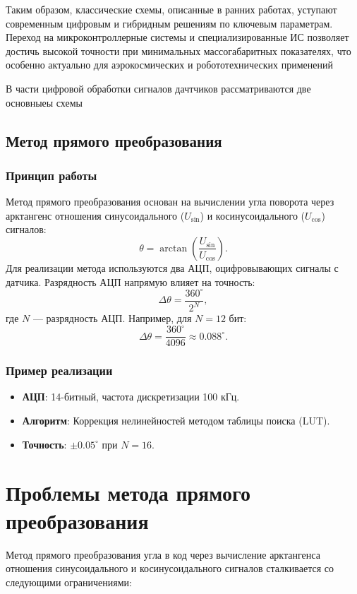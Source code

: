 Таким образом, классические схемы, описанные в ранних работах, уступают современным цифровым и гибридным решениям по ключевым параметрам. 
Переход на микроконтроллерные системы и специализированные ИС позволяет достичь высокой точности при минимальных массогабаритных показателях, 
что особенно актуально для аэрокосмических и робототехнических применений

В части цифровой обработки сигналов дачтчиков рассматриваются две основныеы схемы

\subsection{Метод прямого преобразования}
\subsubsection{Принцип работы}
Метод прямого преобразования \cite{Armenski} основан на вычислении угла поворота через арктангенс отношения синусоидального (\(U_{\sin}\)) и косинусоидального (\(U_{\cos}\)) сигналов:
\[
\theta = \arctan\left(\frac{U_{\sin}}{U_{\cos}}\right).
\]
Для реализации метода используются два АЦП, оцифровывающих сигналы с датчика. Разрядность АЦП напрямую влияет на точность: 
\[
\Delta\theta = \frac{360^\circ}{2^N},
\]
где \(N\) — разрядность АЦП. Например, для \(N = 12\) бит:
\[
\Delta\theta = \frac{360^\circ}{4096} \approx 0.088^\circ.
\]

\subsubsection*{Пример реализации}
\begin{itemize}
    \item \textbf{АЦП}: 14-битный, частота дискретизации 100 кГц.
    \item \textbf{Алгоритм}: Коррекция нелинейностей методом таблицы поиска (LUT).
    \item \textbf{Точность}: \(\pm0.05^\circ\) при \(N=16\).
\end{itemize}
\section{Проблемы метода прямого преобразования}
Метод прямого преобразования угла в код через вычисление арктангенса отношения синусоидального и косинусоидального сигналов сталкивается со следующими ограничениями:

